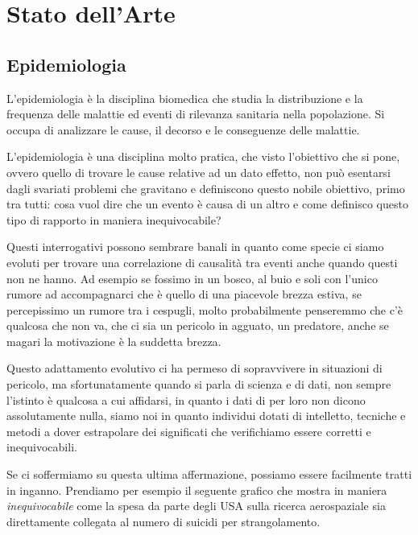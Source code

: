 \section{Stato dell'Arte}

\subsection{Epidemiologia}
L'epidemiologia è la disciplina biomedica che studia la 
distribuzione e la frequenza delle malattie ed eventi di 
rilevanza sanitaria nella popolazione.
Si occupa di analizzare le cause, il decorso e le 
conseguenze delle malattie.\cite{Galea2009-lj} \cite{Parascandola2001-kw}

L'epidemiologia è una disciplina molto pratica, che visto 
l'obiettivo che si pone, ovvero quello di trovare le cause
relative ad un dato effetto, non può esentarsi dagli 
svariati problemi che gravitano e definiscono questo 
nobile obiettivo, primo tra tutti: cosa vuol dire che un
evento è causa di un altro e come definisco questo 
tipo di rapporto in maniera inequivocabile?

Questi interrogativi possono sembrare banali in quanto 
come specie ci siamo evoluti per trovare una correlazione
di causalità tra eventi anche quando questi non ne hanno.
Ad esempio se fossimo in un bosco, al buio e soli con
l'unico rumore ad accompagnarci che è quello di una 
piacevole brezza estiva, se percepissimo un rumore tra 
i cespugli, molto probabilmente penseremmo che c'è 
qualcosa che non va, che ci sia un pericolo in agguato,
un predatore, anche se magari la motivazione è 
la suddetta brezza. 

Questo adattamento evolutivo ci ha permeso di sopravvivere
in situazioni di pericolo, ma sfortunatamente quando 
si parla di scienza e di dati, non sempre l'istinto è 
qualcosa a cui affidarsi, in quanto i dati di
per loro non dicono assolutamente nulla, siamo noi 
in quanto individui dotati di intelletto, tecniche e metodi a dover
estrapolare dei significati che verifichiamo essere corretti e inequivocabili.

Se ci soffermiamo su questa ultima affermazione, possiamo
essere facilmente tratti in inganno. Prendiamo per esempio 
il seguente grafico che mostra in maniera \emph{inequivocabile} 
come la spesa da parte degli USA sulla ricerca aerospaziale sia 
direttamente collegata al numero di suicidi per strangolamento. 

